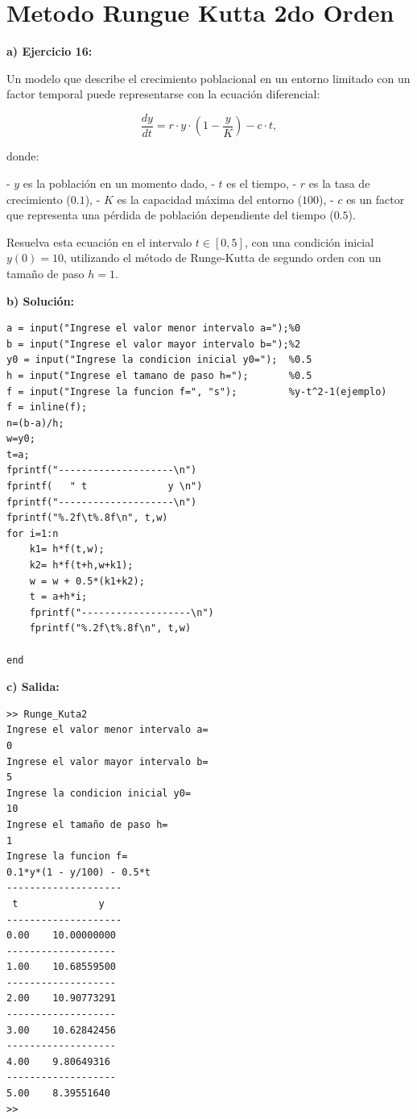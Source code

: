 \documentclass[12pt,a4paper,twoside]{article}  %
\begin{document}
\section{Metodo Rungue Kutta 2do Orden}


\textbf{a) Ejercicio 16: }

Un modelo que describe el crecimiento poblacional en un entorno limitado con un factor temporal puede representarse con la ecuación diferencial:

\[
\frac{dy}{dt} = r \cdot y \cdot \left(1 - \frac{y}{K}\right) - c \cdot t,
\]

donde:

- \( y \) es la población en un momento dado,
- \( t \) es el tiempo,
- \( r \) es la tasa de crecimiento (\( 0.1 \)),
- \( K \) es la capacidad máxima del entorno (\( 100 \)),
- \( c \) es un factor que representa una pérdida de población dependiente del tiempo (\( 0.5 \)).

Resuelva esta ecuación en el intervalo \( t \in [0, 5] \), con una condición inicial \( y(0) = 10 \), utilizando el método de Runge-Kutta de segundo orden con un tamaño de paso \( h = 1 \).

\textbf{b) Solución:}

\begin{lstlisting}
a = input("Ingrese el valor menor intervalo a=");%0
b = input("Ingrese el valor mayor intervalo b=");%2
y0 = input("Ingrese la condicion inicial y0=");  %0.5
h = input("Ingrese el tamano de paso h=");       %0.5
f = input("Ingrese la funcion f=", "s");         %y-t^2-1(ejemplo)
f = inline(f);
n=(b-a)/h;
w=y0;
t=a;
fprintf("--------------------\n")
fprintf(   " t              y \n")
fprintf("--------------------\n")
fprintf("%.2f\t%.8f\n", t,w)
for i=1:n
    k1= h*f(t,w);
    k2= h*f(t+h,w+k1);
    w = w + 0.5*(k1+k2);
    t = a+h*i;
    fprintf("-------------------\n")
    fprintf("%.2f\t%.8f\n", t,w)
    
end

\end{lstlisting}

\textbf{c) Salida:}

\begin{verbatim}
>> Runge_Kuta2
Ingrese el valor menor intervalo a=
0
Ingrese el valor mayor intervalo b=
5
Ingrese la condicion inicial y0=
10
Ingrese el tamaño de paso h=
1
Ingrese la funcion f=
0.1*y*(1 - y/100) - 0.5*t
--------------------
 t              y 
--------------------
0.00	10.00000000
-------------------
1.00	10.68559500
-------------------
2.00	10.90773291
-------------------
3.00	10.62842456
-------------------
4.00	9.80649316
-------------------
5.00	8.39551640
>> 
\end{verbatim}
\end{document}
